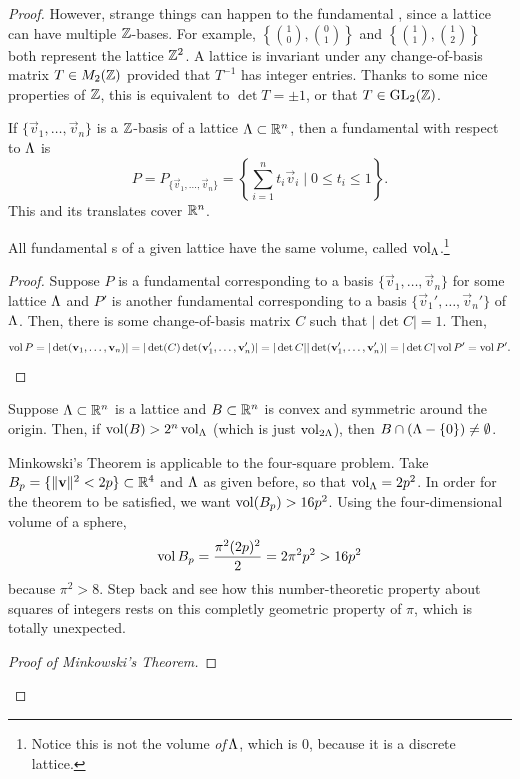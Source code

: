\begin{proof}
However, strange things can happen to the fundamental \ptope, since a lattice can have multiple $\mathbb{Z}$-bases. For example, $\left\{\binom{1}{0},\binom{0}{1}\right\}$ and $\left\{\binom{1}{1},\binom{1}{2}\right\}$ both represent the lattice $\mathbb{Z}^2$. A lattice is invariant under any change-of-basis matrix $T\in M_2(\mathbb{Z})$ provided that $T^{-1}$ has integer entries. Thanks to some nice properties of $\mathbb{Z}$, this is equivalent to $\det T = \pm 1$, or that $T\in\operatorname{GL}_{2}(\mathbb{Z})$.
\begin{defn}
If $\{\vec v_1,\dots,\vec v_n\}$ is a $\mathbb{Z}$-basis of a lattice $\Lambda\subset\mathbb{R}^n$, then a fundamental \ptope{} with respect to $\Lambda$ is 
\[P = P_{\{\vec v_1,\dots,\vec v_n\}} = \left\{\sum_{i=1}^n t_i\vec v_i\mid 0\le t_i\le 1\right\}.\]
This \ptope{} and its translates cover $\mathbb{R}^n$.
\begin{claim}
All fundamental \ptope{}s of a given lattice have the same volume, called $\operatorname{vol}_{\Lambda}$.\footnote{Notice this is not the volume \emph{of} $\!\Lambda$, which is 0, because it is a discrete lattice.}
\end{claim}
\begin{proof}
Suppose $P$ is a fundamental \ptope{} corresponding to a basis $\{\vec v_1,\dots,\vec v_n\}$ for some lattice $\Lambda$ and $P'$ is another fundamental \ptope{} corresponding to a basis $\{\vec v_1',\dots,\vec v_n'\}$ of $\Lambda$. Then, there is some change-of-basis matrix $C$ such that $|\det C| = 1$. Then,
\[\operatorname{vol} P = |\det(\mathbf v_1,\dots,\mathbf v_n)| = |\det(C)\det(\mathbf v_1',\dots,\mathbf v_n')| = |\det C||\det(\mathbf v_1',\dots,\mathbf v_n')| = |\det C|\operatorname{vol} P' =\operatorname{vol} P'.\qedhere\]
\end{proof}
\end{defn}
\begin{thm}[Minkowski]
\label{mink}
Suppose $\Lambda\subset\mathbb{R}^n$ is a lattice and $B\subset\mathbb{R}^n$ is convex and symmetric around the origin. Then, if $\operatorname{vol}(B) > 2^n\operatorname{vol}_{\Lambda}$ (which is just $\operatorname{vol}_{2\Lambda}$), then $B\cap(\Lambda-\{0\}) \ne \emptyset$.
\end{thm}
Minkowski's Theorem is applicable to the four-square problem. Take $B_p = \{\|\mathbf v\|^2 < 2p\}\subset\mathbb{R}^4$ and $\Lambda$ as given before, so that $\operatorname{vol}_\Lambda = 2p^2$. In order for the theorem to be satisfied, we want $\operatorname{vol}(B_p) > 16p^2$. Using the four-dimensional volume of a sphere,
\[\operatorname{vol} B_p = \frac{\pi^2 (2p)^2}{2} = 2\pi^2 p^2 > 16p^2\]
because $\pi^2 > 8$. Step back and see how this number-theoretic property about squares of integers rests on this completly geometric property of $\pi$, which is totally unexpected.
\begin{proof}[Proof of Minkowski's Theorem]

\end{proof}
\end{proof}
